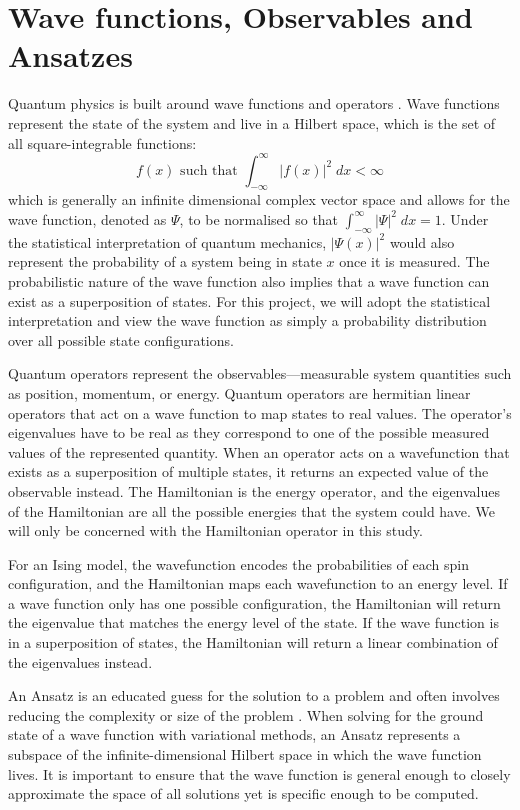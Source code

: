 \section{Wave functions, Observables and Ansatzes}\label{wavefunction}
Quantum physics is built around wave functions and operators \cite{GriffithsSchroeter2018}. Wave functions represent the state of the system and live in a Hilbert space, which is the set of all square-integrable functions:
\begin{equation*}
    f(x) \text{ such that } \int_{-\infty}^\infty |f(x)|^2 \; dx < \infty
\end{equation*}
which is generally an infinite dimensional complex vector space and allows for the wave function, denoted as $\Psi$, to be normalised so that $\int_{-\infty}^\infty |\Psi|^2 \; dx = 1$. Under the statistical interpretation of quantum mechanics, $|\Psi(x)|^2$ would also represent the probability of a system being in state $x$ once it is measured. The probabilistic nature of the wave function also implies that a wave function can exist as a superposition of states. For this project, we will adopt the statistical interpretation and view the wave function as simply a probability distribution over all possible state configurations.

Quantum operators represent the observables---measurable system quantities such as position, momentum, or energy. Quantum operators are hermitian linear operators that act on a wave function to map states to real values. The operator's eigenvalues have to be real as they correspond to one of the possible measured values of the represented quantity. When an operator acts on a wavefunction that exists as a superposition of multiple states, it returns an expected value of the observable instead. The Hamiltonian is the energy operator, and the eigenvalues of the Hamiltonian are all the possible energies that the system could have. We will only be concerned with the Hamiltonian operator in this study.

For an Ising model, the wavefunction encodes the probabilities of each spin configuration, and the Hamiltonian maps each wavefunction to an energy level. If a wave function only has one possible configuration, the Hamiltonian will return the eigenvalue that matches the energy level of the state. If the wave function is in a superposition of states, the Hamiltonian will return a linear combination of the eigenvalues instead.

An Ansatz is an educated guess for the solution to a problem and often involves reducing the complexity or size of the problem \cite{qaoareview}. When solving for the ground state of a wave function with variational methods, an Ansatz represents a subspace of the infinite-dimensional Hilbert space in which the wave function lives. It is important to ensure that the wave function is general enough to closely approximate the space of all solutions yet is specific enough to be computed.

